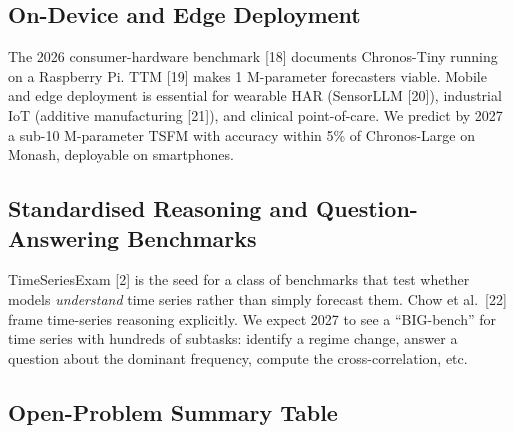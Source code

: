 \documentclass{article}
\begin{document}
\subsection{On-Device and Edge Deployment}\label{on-device-and-edge-deployment}

The 2026 consumer-hardware benchmark {[}18{]} documents Chronos-Tiny running on a Raspberry Pi. TTM {[}19{]} makes 1 M-parameter forecasters viable. Mobile and edge deployment is essential for wearable HAR (SensorLLM {[}20{]}), industrial IoT (additive manufacturing {[}21{]}), and clinical point-of-care. We predict by 2027 a sub-10 M-parameter TSFM with accuracy within 5\% of Chronos-Large on Monash, deployable on smartphones.

\subsection{Standardised Reasoning and Question-Answering Benchmarks}\label{standardised-reasoning-and-question-answering-benchmarks}

TimeSeriesExam {[}2{]} is the seed for a class of benchmarks that test whether models \emph{understand} time series rather than simply forecast them. Chow et al.~{[}22{]} frame time-series reasoning explicitly. We expect 2027 to see a ``BIG-bench'' for time series with hundreds of subtasks: identify a regime change, answer a question about the dominant frequency, compute the cross-correlation, etc.

\subsection{Open-Problem Summary Table}\label{open-problem-summary-table}
\end{document}
